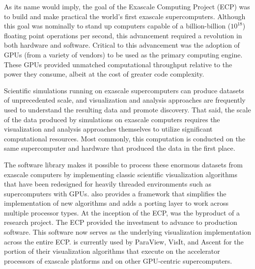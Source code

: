 As its name would imply, the goal of the Exascale Computing Project (ECP) was to build and make practical the world's first exascale supercomputers.
Although this goal was nominally to stand up computers capable of a billion-billion ($10^{18}$) floating point operations per second, this advancement required a revolution in both hardware and software.
Critical to this advancement was the adoption of GPUs (from a variety of vendors) to be used as the primary computing engine.
These GPUs provided unmatched computational throughput relative to the power they consume, albeit at the cost of greater code complexity.%

Scientific simulations running on exascale supercomputers can produce datasets of unprecedented
scale, and
visualization and analysis approaches are frequently used to understand the resulting
data and promote discovery.
%
That said, the scale of the data produced by simulations on exascale computers requires
the visualization and analysis approaches themselves to utilize significant computational resources.
%
Most commonly, this computation is conducted on the same supercomputer and hardware that produced
the data in the first place.

The \vtkm software library makes it possible to process these enormous datasets from exascale computers
by implementing classic scientific visualization algorithms that have been redesigned for heavily threaded environments such as supercomputers with GPUs.
\vtkm also provides a framework that simplifies the implementation of new algorithms and adds a porting layer to work across multiple processor types.
At the inception of the ECP, \vtkm was the byproduct of a research project.
The ECP provided the investment to advance \vtkm to production software.
This software now serves as the underlying visualization implementation across the entire ECP.
\vtkm is currently used by ParaView, VisIt, and Ascent for the portion of their visualization algorithms that execute on the accelerator processors of exascale platforms and on other GPU-centric supercomputers.

